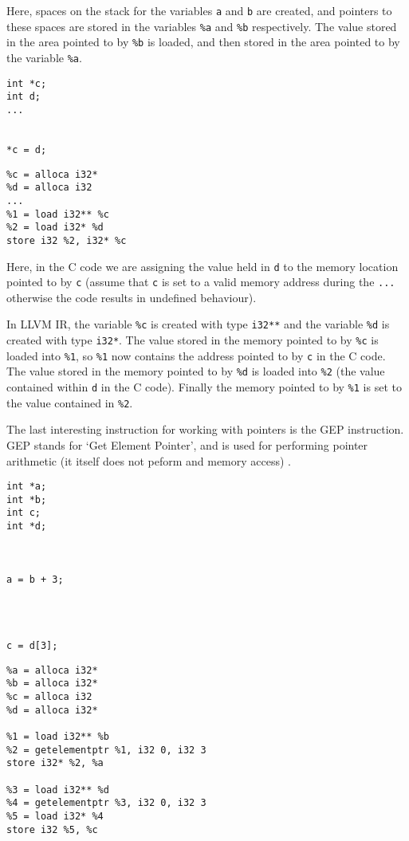 Here, spaces on the stack for the variables \verb!a! and \verb!b! are created, and pointers to these spaces are stored in the variables \verb!%a! and \verb!%b! respectively.
The value stored in the area pointed to by \verb!%b! is loaded, and then stored in the area pointed to by the variable \verb!%a!.

\begin{minipage}[t]{0.5\linewidth}
\begin{verbatim}
int *c;
int d;
...


*c = d;
\end{verbatim}
\end{minipage}
\begin{minipage}[t]{0.5\linewidth}
\begin{verbatim}
%c = alloca i32*
%d = alloca i32
...
%1 = load i32** %c
%2 = load i32* %d
store i32 %2, i32* %c
\end{verbatim}
\end{minipage}

Here, in the C code we are assigning the value held in \verb!d! to the memory location pointed to by \verb!c! (assume that \verb!c! is set to a valid memory address during the \verb!...! otherwise the code results in undefined behaviour).

In LLVM IR, the variable \verb!%c! is created with type \verb!i32**! and the variable \verb!%d! is created with type \verb!i32*!.
The value stored in the memory pointed to by \verb!%c! is loaded into \verb!%1!, so \verb!%1! now contains the address pointed to by \verb!c! in the C code.
The value stored in the memory pointed to by \verb!%d! is loaded into \verb!%2! (the value contained within \verb!d! in the C code).
Finally the memory pointed to by \verb!%1! is set to the value contained in \verb!%2!.

The last interesting instruction for working with pointers is the GEP instruction.
GEP stands for `Get Element Pointer', and is used for performing pointer arithmetic (it itself does not peform and memory access) \cite{llvmGEP}.

\begin{minipage}[t]{0.3\linewidth}
\begin{verbatim}
int *a;
int *b;
int c;
int *d;



a = b + 3;




c = d[3];
\end{verbatim}
\end{minipage}
\begin{minipage}[t]{0.7\linewidth}
\begin{verbatim}
%a = alloca i32*
%b = alloca i32*
%c = alloca i32
%d = alloca i32*

%1 = load i32** %b
%2 = getelementptr %1, i32 0, i32 3
store i32* %2, %a

%3 = load i32** %d
%4 = getelementptr %3, i32 0, i32 3
%5 = load i32* %4
store i32 %5, %c
\end{verbatim}
\end{minipage}

